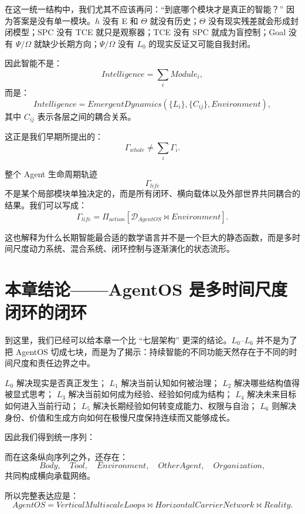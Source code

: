 在这一统一结构中，我们尤其不应该再问：``到底哪个模块才是真正的智能？'' 因为答案是没有单一模块。$h$ 没有 E 和 $\Theta$ 就没有历史；$\Theta$ 没有现实残差就会形成封闭模型；SPC 没有 TCE 就只是观察器；TCE 没有 SPC 就成为盲控制；Goal 没有 $\Psi/\Omega$ 就缺少长期方向；$\Psi/\Omega$ 没有 $L_0$ 的现实反证又可能自我封闭。

因此智能不是：
\[
Intelligence
=
\sum_i Module_i,
\]
而是：
\[
\boxed{
Intelligence
=
EmergentDynamics
\left(
\{L_i\},
\{C_{ij}\},
Environment
\right),
}
\]
其中 $C_{ij}$ 表示各层之间的耦合关系。

这正是我们早期所提出的：
\[
\boxed{
\Gamma_{whole}
\neq
\sum_i
\Gamma_i.
}
\]

整个 Agent 生命周期轨迹
\[
\Gamma_{life}
\]
不是某个局部模块单独决定的，而是所有闭环、横向载体以及外部世界共同耦合的结果。我们可以写成：
\[
\boxed{
\Gamma_{life}
=
\Pi_{action}
\left[
\mathcal D_{AgentOS}
\bowtie
Environment
\right].
}
\]

这也解释为什么长期智能最合适的数学语言并不是一个巨大的静态函数，而是多时间尺度动力系统、混合系统、闭环控制与逐渐演化的状态流形。

\section{本章结论——AgentOS 是多时间尺度闭环的闭环}

到这里，我们已经可以给本章一个比 ``七层架构'' 更深的结论。$L_0$--$L_6$ 并不是为了把 AgentOS 切成七块，而是为了揭示：持续智能的不同功能天然存在于不同的时间尺度和责任边界之中。

$L_0$ 解决现实是否真正发生；
$L_1$ 解决当前认知如何被治理；
$L_2$ 解决哪些结构值得被显式思考；
$L_3$ 解决当前如何成为经验、经验如何成为结构；
$L_4$ 解决未来目标如何进入当前行动；
$L_5$ 解决长期经验如何转变成能力、权限与自治；
$L_6$ 则解决身份、价值和生成方向如何在极慢尺度保持连续而又能够成长。

因此我们得到统一序列：
\begin{statementbox}
\centering
{}
\end{statementbox}

而在这条纵向序列之外，还存在：
\[
Body,
\quad
Tool,
\quad
Environment,
\quad
OtherAgent,
\quad
Organization,
\]
共同构成横向承载网络。

所以完整表达应是：
\[
\boxed{
AgentOS
=
VerticalMultiscaleLoops
\bowtie
HorizontalCarrierNetwork
\bowtie
Reality.
}
\]

